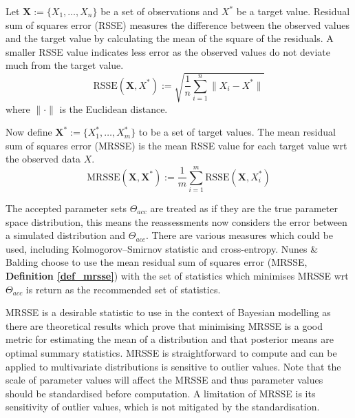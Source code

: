 \documentclass[bibliography=totoc,11pt,a4paper,margin=0]{article}
\theoremstyle{break}
\begin{document}
  \begin{box_definition}\label{def_mrsse}
    Let $\mathbf{X}:=\{X_1,\dots,X_n\}$ be a set of observations and $X^*$ be a target value. Residual sum of squares error (RSSE) measures the difference between the observed values and the target value by calculating the mean of the square of the residuals. A smaller RSSE value indicates less error as the observed values do not deviate much from the target value.
    \[ \text{RSSE}(\mathbf{X},X^*):=\sqrt{\frac1n\sum_{i=1}^n\|X_i-X^*\|} \]
    where $\|\cdot\|$ is the Euclidean distance.
    \par Now define $\mathbf{X}^*:=\{X_1^*,\dots,X_m^*\}$ to be a set of target values. The mean residual sum of squares error (MRSSE) is the mean RSSE value for each target value wrt the observed data $X$.
    \[ \text{MRSSE}(\mathbf{X},\mathbf{X}^*):=\frac1m\sum_{i=1}^m\text{RSSE}(\mathbf{X},X_i^*) \]
  \end{box_definition}

  \par The accepted parameter sets $\Theta_{acc}$ are treated as if they are the true parameter space distribution, this means the reassessments now considers the error between a simulated distribution and $\Theta_{acc}$. There are various measures which could be used, including Kolmogorov–Smirnov statistic \cite[]{kolmogorov_smirnov_statistics} and cross-entropy. Nunes \& Balding choose to use the mean residual sum of squares error (MRSSE, \textbf{Definition \ref{def_mrsse}}) with the set of statistics which minimises MRSSE wrt $\Theta_{acc}$ is return as the recommended set of statistics.

  \par MRSSE is a desirable statistic to use in the context of Bayesian modelling as there are theoretical results which prove that minimising MRSSE is a good metric for estimating the mean of a distribution and that posterior means are optimal summary statistics. %
  MRSSE is straightforward to compute and can be applied to multivariate distributions is sensitive to outlier values. Note that the scale of parameter values will affect the MRSSE and thus parameter values should be standardised before computation. A limitation of MRSSE is its sensitivity of outlier values, which is not mitigated by the standardisation.
\end{document}
